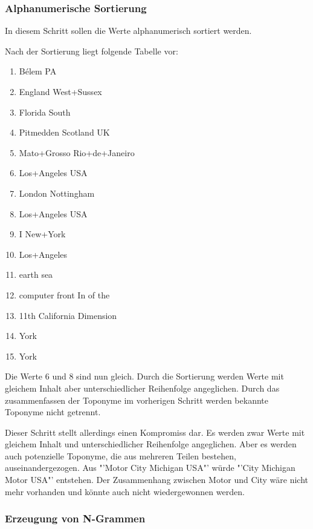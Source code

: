 			\subsubsection{Alphanumerische Sortierung}

				In diesem Schritt sollen die Werte alphanumerisch sortiert werden. 

				Nach der Sortierung liegt folgende Tabelle vor:

				\begin{multicols}{2}
					\begin{enumerate}
						\item Bélem PA
						\item England West+Sussex
						\item Florida South
						\item Pitmedden Scotland UK
						\item Mato+Grosso Rio+de+Janeiro
						\item Los+Angeles USA
						\item London Nottingham
						\item Los+Angeles USA
						\item I New+York 
						\item Los+Angeles
						\item earth sea
						\item computer front In of the 
						\item 11th California Dimension 
						\item York
						\item York
					\end{enumerate}
				\end{multicols}

				Die Werte 6 und 8 sind nun gleich. 
				Durch die Sortierung werden Werte mit gleichem Inhalt aber unterschiedlicher Reihenfolge angeglichen.
				Durch das zusammenfassen der Toponyme im vorherigen Schritt werden bekannte Toponyme nicht getrennt.

				Dieser Schritt stellt allerdings einen Kompromiss dar.
				Es werden zwar Werte mit gleichem Inhalt und unterschiedlicher Reihenfolge angeglichen.
				Aber es werden auch potenzielle Toponyme, die aus mehreren Teilen bestehen, auseinandergezogen.
				Aus "'Motor City Michigan USA"' würde "'City Michigan Motor USA"' entstehen.
				Der Zusammenhang zwischen Motor und City wäre nicht mehr vorhanden und könnte auch nicht wiedergewonnen werden.

			\subsubsection{Erzeugung von N-Grammen}

